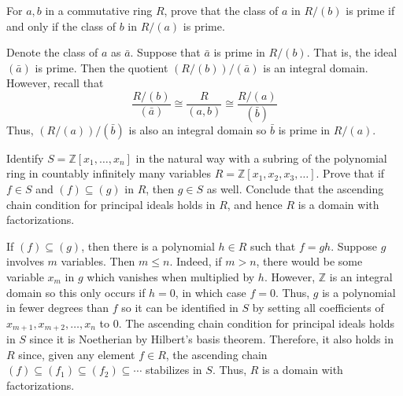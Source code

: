 \documentclass[../../master.tex]{subfiles}
\begin{document}
    \begin{problem}
        For $a, b$ in a commutative ring $R$, prove that the class of $a$ in $R
        / (b)$ is prime if and only if the class of $b$ in $R / (a)$ is prime.
    \end{problem}

    \begin{solution}
        Denote the class of $a$ as $\bar{a}$. Suppose that $\bar{a}$ is prime in
        $R / (b)$. That is, the ideal $(\bar{a})$ is prime. Then the quotient
        $(R / (b)) / (\bar{a})$ is an integral domain. However, recall that
        \[
            \frac{R / (b)}{(\bar{a})} \cong \frac{R}{(a, b)} \cong \frac{R /
            (a)}{(\bar{b})}
        \] 
        Thus, $(R / (a)) / (\bar{b})$ is also an integral domain so $\bar{b}$ is
        prime in $R / (a)$.
    \end{solution}

    \begin{problem}
        Identify $S = \mathbb{Z}[x_1, \ldots, x_n]$ in the natural way with a
        subring of the polynomial ring in countably infinitely many variables $R
        = \mathbb{Z}[x_1, x_2, x_3, \ldots]$. Prove that if $f \in S$ and $(f)
        \subseteq (g)$ in $R$, then $g \in S$ as well. Conclude that the
        ascending chain condition for principal ideals holds in $R$, and hence
        $R$ is a domain with factorizations.
    \end{problem}

    \begin{solution}
        If $(f) \subseteq (g)$, then there is a polynomial $h \in R$ such that
        $f = gh$. Suppose $g$ involves $m$ variables. Then $m \leq n$. Indeed,
        if $m > n$, there would be some variable $x_m$ in $g$ which vanishes
        when multiplied by $h$. However, $\mathbb{Z}$ is an integral domain so
        this only occurs if $h = 0$, in which case $f = 0$. Thus, $g$ is a
        polynomial in fewer degrees than $f$ so it can be identified in $S$ by
        setting all coefficients of $x_{m+1}, x_{m+2}, \ldots, x_n$ to 0. The
        ascending chain condition for principal ideals holds in $S$ since it is
        Noetherian by Hilbert's basis theorem. Therefore, it also holds in $R$
        since, given any element $f \in R$, the ascending chain $(f) \subseteq
        (f_1) \subseteq (f_2) \subseteq \cdots$ stabilizes in $S$. Thus, $R$ is
        a domain with factorizations.
    \end{solution}
\end{document}

